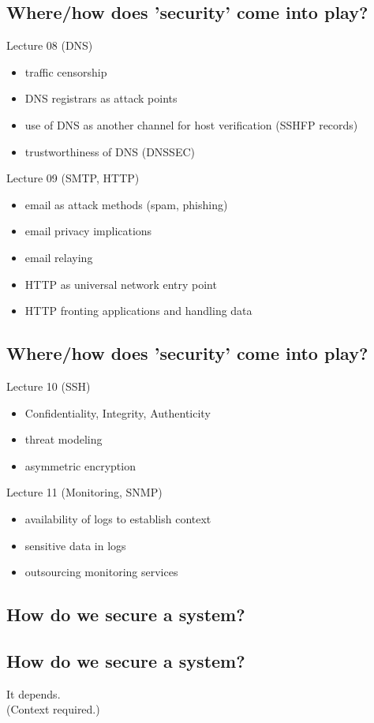 \documentclass[xga]{xdvislides}
\begin{document}
\subsection{Where/how does 'security' come into play?}
Lecture 08 (DNS)
\begin{itemize}
	\item traffic censorship
	\item DNS registrars as attack points
	\item use of DNS as another channel for host verification (SSHFP records)
	\item trustworthiness of DNS (DNSSEC)
\end{itemize}
\vspace{.5in}
Lecture 09 (SMTP, HTTP)
\begin{itemize}
	\item email as attack methods (spam, phishing)
	\item email privacy implications
	\item email relaying
	\item HTTP as universal network entry point
	\item HTTP fronting applications and handling data
\end{itemize}

\subsection{Where/how does 'security' come into play?}
Lecture 10 (SSH)
\begin{itemize}
	\item Confidentiality, Integrity, Authenticity
	\item threat modeling
	\item asymmetric encryption
\end{itemize}
\vspace{.5in}
Lecture 11 (Monitoring, SNMP)
\begin{itemize}
	\item availability of logs to establish context
	\item sensitive data in logs
	\item outsourcing monitoring services
\end{itemize}

\subsection{How do we secure a system?}

\subsection{How do we secure a system?}
\Huge
\vspace*{\fill}
\begin{center}
	It depends. \\
\vspace{.5in}
\Normalsize
	(Context required.)
\end{center}
\vspace*{\fill}
\end{document}
